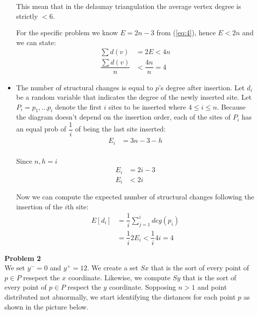 \documentclass[12pt]{article}
\begin{document}
\begin{itemize}
	This mean that in the delaunay triangulation the average vertex degree is strictly $< 6$.
	
	For the specific problem we know $E = 2n - 3$ from (\ref{eq:4}), hence $E < 2n$ and we can state:
	\begin{equation}
		\begin{aligned}
			\sum d(v) &= 2E < 4n \\
			\dfrac{ \sum d(v) } {n} &< \dfrac{4n}{n} = 4
		\end{aligned}
	\end{equation}
	
	\item The number of structural changes is equal to $p$'s degree after insertion. Let $d_i$ be a random variable that indicates the degree of the newly inserted site. Let $P_i = {p_1, ... p_i}$ denote the first $i$ sites to be inserted where $4 \leq i \leq n$. Because the diagram doesn't depend on the insertion order, each of the sites of $P_i$ has an equal prob of $\dfrac{1}{i}$ of being the last site inserted:
	\begin{equation}
		\begin{aligned}
			E_i &= 3n - 3 - h \\
		\end{aligned}
	\end{equation}
	
	Since $n,h=i$
	\begin{equation}
		\begin{aligned}
			E_i &= 2i - 3 \\
			E_i &< 2i
		\end{aligned}
	\end{equation}
	
	Now we can compute the expected number of structural changes following the insertion of the $i$th site:
	\begin{equation}
		\begin{aligned}
			E[d_i] &= \dfrac{1}{i} \sum_{j=1}^{i} deg(p_i) \\
			&= \dfrac{1}{i} 2 E_i < \dfrac{1}{i} 4i = 4
		\end{aligned}
	\end{equation}
	
\end{itemize}

\noindent \textbf{Problem 2}\\
We set $y^{-} = 0$ and $y^{+}=12$. We create a set $Sx$ that is the sort of every point of $p \in P$ resepect the $x$ coordinate. Likewise, we compute $Sy$ that is the sort of every point of $p \in P$ respect the $y$ coordinate. Sopposing $n > 1$ and point distributed not abnormally, we start identifying the distances for each point $p$ as shown in the picture below. 
\end{document}
